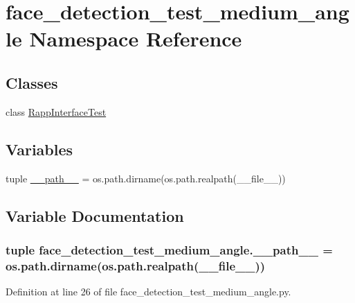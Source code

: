 \hypertarget{namespaceface__detection__test__medium__angle}{\section{face\-\_\-detection\-\_\-test\-\_\-medium\-\_\-angle Namespace Reference}
\label{namespaceface__detection__test__medium__angle}
}
\subsection*{Classes}
\begin{DoxyCompactItemize}
\item 
class \hyperlink{classface__detection__test__medium__angle_1_1RappInterfaceTest}{Rapp\-Interface\-Test}
\end{DoxyCompactItemize}
\subsection*{Variables}
\begin{DoxyCompactItemize}
\item 
tuple \hyperlink{namespaceface__detection__test__medium__angle_a4787cfacb809d451d0b5483fd92812ea}{\-\_\-\-\_\-path\-\_\-\-\_\-} = os.\-path.\-dirname(os.\-path.\-realpath(\-\_\-\-\_\-file\-\_\-\-\_\-))
\end{DoxyCompactItemize}


\subsection{Variable Documentation}
\hypertarget{namespaceface__detection__test__medium__angle_a4787cfacb809d451d0b5483fd92812ea}{
\subsubsection[{\-\_\-\-\_\-path\-\_\-\-\_\-}]{\setlength{\rightskip}{0pt plus 5cm}tuple face\-\_\-detection\-\_\-test\-\_\-medium\-\_\-angle.\-\_\-\-\_\-path\-\_\-\-\_\- = os.\-path.\-dirname(os.\-path.\-realpath(\-\_\-\-\_\-file\-\_\-\-\_\-))}}\label{namespaceface__detection__test__medium__angle_a4787cfacb809d451d0b5483fd92812ea}


Definition at line 26 of file face\-\_\-detection\-\_\-test\-\_\-medium\-\_\-angle.\-py.


